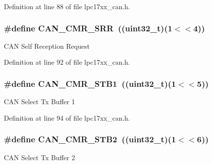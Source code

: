 \-Definition at line 88 of file lpc17xx\-\_\-can.\-h.

\hypertarget{group___c_a_n___private___macros_gadf85238951b64fd26cc0efcb0e8508ec}{
\subsubsection[{\-C\-A\-N\-\_\-\-C\-M\-R\-\_\-\-S\-R\-R}]{\setlength{\rightskip}{0pt plus 5cm}\#define {\bf \-C\-A\-N\-\_\-\-C\-M\-R\-\_\-\-S\-R\-R}~((uint32\-\_\-t)(1$<$$<$4))}}\label{group___c_a_n___private___macros_gadf85238951b64fd26cc0efcb0e8508ec}
\-C\-A\-N \-Self \-Reception \-Request 

\-Definition at line 92 of file lpc17xx\-\_\-can.\-h.

\hypertarget{group___c_a_n___private___macros_gae80bee474faaf1c9b36d910256589531}{
\subsubsection[{\-C\-A\-N\-\_\-\-C\-M\-R\-\_\-\-S\-T\-B1}]{\setlength{\rightskip}{0pt plus 5cm}\#define {\bf \-C\-A\-N\-\_\-\-C\-M\-R\-\_\-\-S\-T\-B1}~((uint32\-\_\-t)(1$<$$<$5))}}\label{group___c_a_n___private___macros_gae80bee474faaf1c9b36d910256589531}
\-C\-A\-N \-Select \-Tx \-Buffer 1 

\-Definition at line 94 of file lpc17xx\-\_\-can.\-h.

\hypertarget{group___c_a_n___private___macros_ga30a4cdbb4aecb78241cf9543665c358f}{
\subsubsection[{\-C\-A\-N\-\_\-\-C\-M\-R\-\_\-\-S\-T\-B2}]{\setlength{\rightskip}{0pt plus 5cm}\#define {\bf \-C\-A\-N\-\_\-\-C\-M\-R\-\_\-\-S\-T\-B2}~((uint32\-\_\-t)(1$<$$<$6))}}\label{group___c_a_n___private___macros_ga30a4cdbb4aecb78241cf9543665c358f}
\-C\-A\-N \-Select \-Tx \-Buffer 2 

